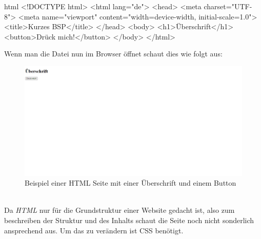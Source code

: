 		\begin{code}{html}
			<!DOCTYPE html>
			<html lang="de">
				<head>
					<meta charset="UTF-8">
					<meta name="viewport" content="width=device-width, initial-scale=1.0">
					<title>Kurzes BSP</title>
				</head>
				<body>
					<h1>Überschrift</h1>
					<button>Drück mich!</button>
				</body>
			</html>
		\end{code}
		Wenn man die Datei nun im Browser öffnet schaut dies wie folgt aus:
		\begin{figure}[H]
			\centering
			\includegraphics[width=1\linewidth]{images/html1}
			\caption[HTML Beispielseite]{Beispiel einer HTML Seite mit einer Überschrift und einem Button}
			\label{fig:htmlbsp}
		\end{figure}
		~\\
		Da \textit{HTML} nur für die Grundstruktur einer Website gedacht ist, also zum beschreiben der Struktur und des Inhalts schaut die Seite noch nicht sonderlich ansprechend aus. Um das zu verändern ist CSS benötigt.
		
